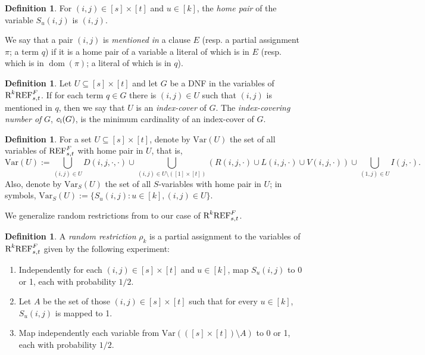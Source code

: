 \documentclass[10pt,a4paper]{article}
\theoremstyle{remark}
\newtheorem*{switching lemma}{Switching Lemma}
\newtheorem*{open problem}{Open Problem}
\theoremstyle{definition}
\newtheorem{definition}[theorem]{Definition}
\DeclareMathOperator{\dom}{dom}
\begin{document}
\begin{definition}
For $(i,j) \in [s] \times [t]$ and $u \in [k]$, the \emph{home pair} of the variable $S_u(i,j)$ is $(i,j)$.

We say that a pair $(i,j)$ is \emph{mentioned in} a clause $E$ (resp. a partial assignment $\pi$; a term $q$) if it is a home pair of a variable a literal of which is in $E$ (resp. which is in $\dom(\pi)$; a literal of which is in $q$).
\end{definition}


\begin{definition}
Let $U \subseteq [s] \times [t]$ and let $G$ be a DNF in the variables of $\textnormal{R}^k\textnormal{REF}^{F}_{s,t}$. If for each term $q \in G$ there is $(i,j) \in U$ such that $(i,j)$ is mentioned in $q$, then we say that $U$ is an \emph{index-cover} of $G$. The \emph{index-covering number of} $G$, $c_{\textnormal{i}}(G)$, is the minimum cardinality of an index-cover of $G$.
\end{definition}

\begin{definition}
For a set $U \subseteq [s] \times [t]$, denote by $\text{Var}(U)$ the set of all variables of $\textnormal{REF}^{F}_{s,t}$ with home pair in $U$, that is, 
\[
 \text{Var}(U) := \bigcup_{(i,j) \in U} D(i,j,\cdot, \cdot) \cup \bigcup_{(i,j) \in U \setminus ([1] \times [t])} \left( R(i,j,\cdot) \cup L(i,j,\cdot) \cup V(i,j,\cdot) \right) \cup \bigcup_{(1,j) \in U} I(j,\cdot).
\]
Also, denote by $\text{Var}_S(U)$ the set of all $S$-variables with home pair in $U$; in symbols, $\text{Var}_S(U) := \{ S_u(i,j) : u \in [k], (i,j) \in U \}$.
\end{definition}

We generalize random restrictions from \cite{atserias-muller2019-focs} to our case of $\textnormal{R}^k\textnormal{REF}^{F}_{s,t}$.

\begin{definition}
\label{def:random_restriction}
A \emph{random restriction} $\rho_k$ is a partial assignment to the variables of $\textnormal{R}^k\textnormal{REF}^{F}_{s,t}$ given by the following experiment:
\begin{enumerate}
\item Independently for each $(i,j) \in [s] \times [t]$ and $u \in [k]$, map $S_u(i,j)$ to 0 or 1, each with probability $1/2$. 
\item Let $A$ be the set of those $(i,j) \in [s] \times [t]$ such that for every $u \in [k]$, $S_u(i,j)$ is mapped to 1.
\item Map independently each variable from $\text{Var}(([s] \times [t]) \setminus A)$ to 0 or 1, each with probability $1/2$.
\end{enumerate}
\end{definition}
\end{document}
